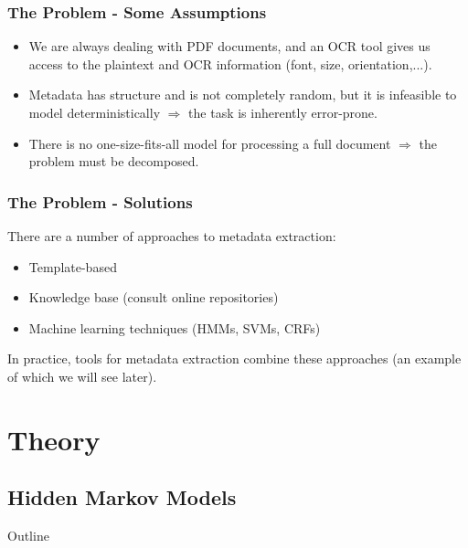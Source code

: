\documentclass{beamer}
\begin{document}

\begin{frame}
\frametitle{The Problem - Some Assumptions}
\begin{itemize}
\item We are always dealing with PDF documents, and an OCR tool gives us access to the plaintext and OCR information (font, size, orientation,...).
\item Metadata has structure and is not completely random, but it is infeasible to model deterministically $\Rightarrow$ the task is inherently error-prone.
\item There is no one-size-fits-all model for processing a full document $\Rightarrow$ the problem must be decomposed.
\end{itemize}
\end{frame}


\begin{frame}
\frametitle{The Problem - Solutions}
There are a number of approaches to metadata extraction:
\begin{itemize}
\item Template-based
\item Knowledge base (consult online repositories)
\item Machine learning techniques (HMMs, SVMs, CRFs)
\end{itemize}
In practice, tools for metadata extraction combine these approaches (an example of which we will see later). %
\end{frame}


\section{Theory}
\subsection{Hidden Markov Models}


\begin{frame}[noframenumbering]{Outline}
\tableofcontents[currentsubsection]
\end{frame}

\end{document}
